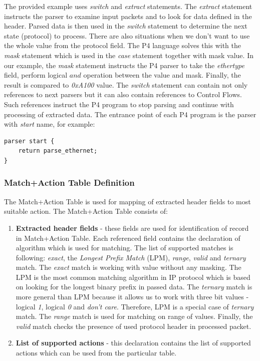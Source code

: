 The provided example uses \textit{switch} and \textit{extract} statements. 
The \textit{extract} statement instructs the parser to examine input packets and to look for data defined in the header. 
Parsed data is then used in the \textit{switch} statement to determine the next state (protocol) to process. There are also situations when
we don't want to use the whole value from the protocol field. The P4 language solves this with the \textit{mask} 
statement which is used in the \textit{case} statement together with mask value. In our example, the \textit{mask} statement instructs 
the P4 parser to take the \textit{ethertype} field, perform logical $and$ operation between the value and mask. 
Finally, the result is compared to \textit{0xA100} value. 
The \textit{switch} statement can contain not only references to next parsers but it can also contain references to Control Flows. 
Such references instruct the P4 program to stop parsing and continue with processing of extracted data.
The entrance point of each P4 program is the parser with \textit{start} name, for example:
\begin{Verbatim}[fontsize=\small]
 parser start {
    return parse_ethernet;
}
\end{Verbatim}

\subsubsection*{Match+Action Table Definition}
\label{subsubsec:matchActionTableDefinition}
The Match+Action Table is used for mapping of extracted header fields to most suitable action. The Match+Action Table consists of:
\begin{enumerate}
    \item \textbf{Extracted header fields} - these fields are used for identification of record in Match+Action Table. 
    Each referenced field contains the declaration of algorithm which is used for matching. The list of supported matches is following: 
    \textit{exact}, the \textit{Longest Prefix Match} (LPM), \textit{range}, \textit{valid} and \textit{ternary} match. 
    The \textit{exact} match is working with value without any masking. The LPM is the most common matching algorithm 
    in IP protocol which is based on looking for the longest binary prefix in passed data. 
    The \textit{ternary} match is more general than LPM because 
    it allows us to work with three bit values - logical \textit{1}, logical \textit{0} and \textit{don't care}. 
    Therefore, LPM is a special case of \textit{ternary} match. 
    The \textit{range} match is used for matching on range of values. Finally, the \textit{valid} match checks the presence of used
    protocol header in processed packet.
    \item \textbf{List of supported actions} - this declaration contains the list of supported actions which can be used from the particular table.
\end{enumerate}

